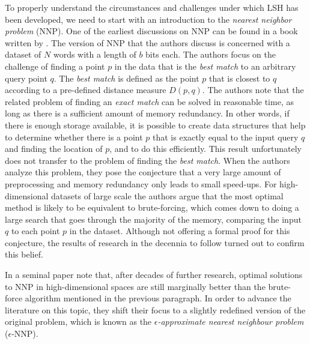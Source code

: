 To properly understand the circumstances and challenges under which LSH has been developed, we need to start with an introduction to the \textit{nearest neighbor problem} (NNP). One of the earliest discussions on NNP can be found in a book written by \cite{Minsky69}.%
The version of NNP that the authors discuss is concerned with a dataset of $N$ words with a length of $b$ bits each. The authors focus on the challenge of finding a point $p$ in the data that is the \textit{best match} to an arbitrary query point $q$. The \textit{best match} is defined as the point $p$ that is closest to $q$ according to a pre-defined distance measure $D(p,q)$. 
The authors note that the related problem of finding an \textit{exact match} can be solved in reasonable time, as long as there is a sufficient amount of memory redundancy. In other words, if there is enough storage available, it is possible to create data structures that help to determine whether there is a point $p$ that is exactly equal to the input query $q$ and finding the location of $p$, and to do this efficiently. This result unfortunately does not transfer to the problem of finding the \textit{best match}. When the authors analyze this problem, they pose the conjecture that a very large amount of preprocessing and memory redundancy only leads to small speed-ups. For high-dimensional datasets of large scale the authors argue that the most optimal method is likely to be equivalent to brute-forcing, which comes down to doing a large search that goes through the majority of the memory, comparing the input $q$ to each point $p$ in the dataset. Although not offering a formal proof for this conjecture, the results of research in the decennia to follow turned out to confirm this belief.

In a seminal paper \cite{IndykM98} note that, after decades of further research, optimal solutions to NNP in high-dimensional spaces are still marginally better than the brute-force algorithm mentioned in the previous paragraph. In order to advance the literature on this topic, they shift their focus to a slightly redefined version of the original problem, which is known as the \textit{$\epsilon$-approximate nearest neighbour problem} ($\epsilon$-NNP).

